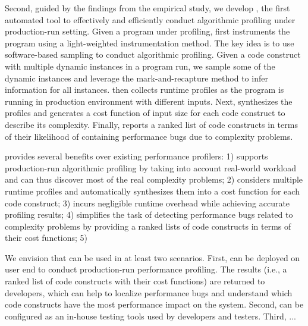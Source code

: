 Second, guided by the findings from the empirical
study, we develop \Tool, the first automated tool to effectively and efficiently 
conduct algorithmic profiling  under production-run setting.
Given a program under profiling, \Tool first instruments the program
using a light-weighted instrumentation method. 
The key idea is to use software-based sampling to conduct algorithmic profiling.
Given a code construct with multiple dynamic instances in a program run,
we sample some of the dynamic instances and leverage the mark-and-recapture
method \citep{mark-recapture} to infer information for all instances.
 
\Tool then collects runtime profiles as the program is running
in production environment with different inputs.
Next, \Tool synthesizes the profiles and generates a cost function of input size
for each code construct to describe its complexity. 
Finally, \Tool  reports a ranked list of code constructs in terms of their likelihood
of containing performance bugs due to complexity problems.  



\Tool provides several benefits over existing performance profilers:
1) \Tool supports production-run algorithmic profiling by taking into account
real-world workload and can thus discover most of the real complexity problems;
2) \Tool considers multiple runtime profiles and automatically synthesizes them
into a cost function for each code construct; 
3) \Tool incurs negligible runtime overhead while achieving accurate profiling results;
4) \Tool  simplifies the task of detecting performance bugs related to complexity
problems by providing a ranked lists of code constructs in terms of their
cost functions; 
5)  




We envision that \Tool can be used in at least two scenarios. 
First, \Tool can be deployed on user end to conduct production-run performance
profiling. The results (i.e., a ranked list of code constructs with their cost functions)
are returned to developers, which can help to localize performance 
bugs and understand 
which code constructs have the most performance impact on the system.
Second, \Tool can be configured as an in-house testing tools used by 
developers and testers. 
Third, ... 


